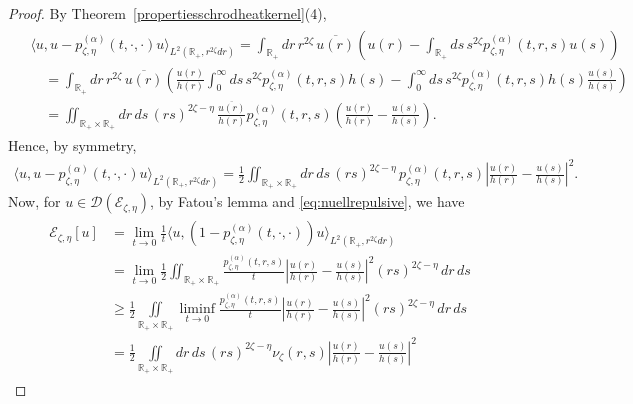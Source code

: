 \documentclass[10pt,a4paper]{amsart}
\def\ce{\mathcal{E}}
\newcommand{\D}{\mathcal{D}}
\newcommand{\R}{\mathbb{R}}
\begin{document}
\begin{proof}
  By Theorem~\ref{propertiesschrodheatkernel}(4),
  \begin{align}
    \begin{split}
      & \langle u,u-p_{\zeta,\eta}^{(\alpha)}(t,\cdot,\cdot)u\rangle_{L^2(\R_+,r^{2\zeta}dr)}
      = \int_{\R_+}dr\, r^{2\zeta}\, \overline{u(r)}\left(u(r) - \int_{\R_+}ds\, s^{2\zeta} p_{\zeta,\eta}^{(\alpha)}(t,r,s) u(s)\right) \\
      & \quad = \int_{\R_+}dr\, r^{2\zeta}\, \overline{u(r)}\left(\frac{u(r)}{h(r)} \int_0^\infty ds\, s^{2\zeta} p_{\zeta,\eta}^{(\alpha)}(t,r,s)h(s) - \int_0^\infty ds\, s^{2\zeta} p_{\zeta,\eta}^{(\alpha)}(t,r,s)h(s)\frac{u(s)}{h(s)}\right) \\
      & \quad = \iint_{\R_+\times\R_+}dr\,ds\, (rs)^{2\zeta-\eta}\, \frac{\overline{u(r)}}{h(r)} p_{\zeta,\eta}^{(\alpha)}(t,r,s)\left(\frac{u(r)}{h(r)} - \frac{u(s)}{h(s)}\right).
    \end{split}
  \end{align}
  Hence, by symmetry,
  \begin{align}
    \langle u,u-p_{\zeta,\eta}^{(\alpha)}(t,\cdot,\cdot)u\rangle_{L^2(\R_+,r^{2\zeta}dr)}
    = \frac12 \iint_{\R_+\times\R_+}dr\,ds\, (rs)^{2\zeta-\eta}\, p_{\zeta,\eta}^{(\alpha)}(t,r,s)\left|\frac{u(r)}{h(r)} - \frac{u(s)}{h(s)}\right|^2.
  \end{align}
  Now, for $u\in\D(\ce_{\zeta,\eta})$, by Fatou's lemma and \eqref{eq:nuellrepulsive}, we have
  \begin{align}
    \begin{split}
      \ce_{\zeta,\eta}[u]
      & = \lim_{t\to0}\frac1t\langle u,(1-p_{\zeta,\eta}^{(\alpha)}(t,\cdot,\cdot))u\rangle_{L^2(\R_+,r^{2\zeta}dr)} \\
      & = \lim_{t\to0}\frac12\iint_{\R_+\times\R_+}\frac{p_{\zeta,\eta}^{(\alpha)}(t,r,s)}{t} \left|\frac{u(r)}{h(r)} - \frac{u(s)}{h(s)}\right|^2 (rs)^{2\zeta-\eta}\,dr\,ds \\
      & \geq \frac12\iint\limits_{\R_+\times\R_+}\liminf_{t\to0}\frac{p_{\zeta,\eta}^{(\alpha)}(t,r,s)}{t} \left|\frac{u(r)}{h(r)} - \frac{u(s)}{h(s)}\right|^2 (rs)^{2\zeta-\eta}\,dr\,ds \\
      & = \frac12\iint\limits_{\R_+\times\R_+}dr\,ds\, (rs)^{2\zeta-\eta}\nu_\zeta(r,s) \left|\frac{u(r)}{h(r)} - \frac{u(s)}{h(s)}\right|^2

\end{split}
\end{align}
\end{proof}
\end{document}

